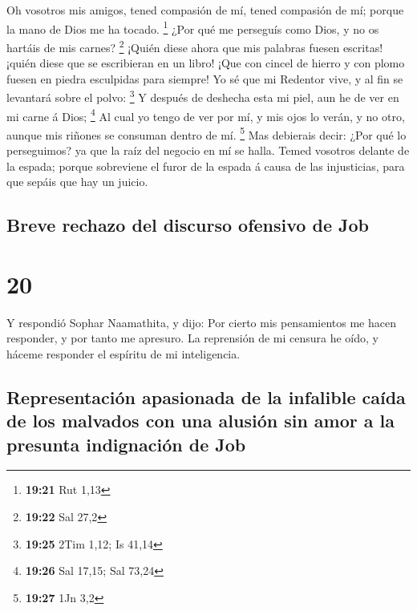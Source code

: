 Oh vosotros mis amigos, tened compasión de mí, tened
compasión de mí; porque la mano de Dios me ha tocado. \footnote{\textbf{19:21}
  Rut 1,13}  ¿Por qué me perseguís como Dios, y no os
hartáis de mis carnes? \footnote{\textbf{19:22} Sal 27,2} 
¡Quién diese ahora que mis palabras fuesen escritas! ¡quién diese que se
escribieran en un libro!  ¡Que con cincel de hierro y con
plomo fuesen en piedra esculpidas para siempre!  Yo sé que
mi Redentor vive, y al fin se levantará sobre el polvo: \footnote{\textbf{19:25}
  2Tim 1,12; Is 41,14}  Y después de deshecha esta mi piel,
aun he de ver en mi carne á Dios; \footnote{\textbf{19:26} Sal 17,15;
  Sal 73,24}  Al cual yo tengo de ver por mí, y mis ojos lo
verán, y no otro, aunque mis riñones se consuman dentro de mí.
\footnote{\textbf{19:27} 1Jn 3,2}  Mas debierais decir:
¿Por qué lo perseguimos? ya que la raíz del negocio en mí se halla.
 Temed vosotros delante de la espada; porque sobreviene el
furor de la espada á causa de las injusticias, para que sepáis que hay
un juicio.

\hypertarget{breve-rechazo-del-discurso-ofensivo-de-job}{%
\subsection{Breve rechazo del discurso ofensivo de
Job}\label{breve-rechazo-del-discurso-ofensivo-de-job}}

\hypertarget{section-19}{%
\section{20}\label{section-19}}

 Y respondió Sophar Naamathita, y dijo:  Por
cierto mis pensamientos me hacen responder, y por tanto me apresuro.
 La reprensión de mi censura he oído, y háceme responder el
espíritu de mi inteligencia.

\hypertarget{representaciuxf3n-apasionada-de-la-infalible-cauxedda-de-los-malvados-con-una-alusiuxf3n-sin-amor-a-la-presunta-indignaciuxf3n-de-job}{%
\subsection{Representación apasionada de la infalible caída de los
malvados con una alusión sin amor a la presunta indignación de
Job}\label{representaciuxf3n-apasionada-de-la-infalible-cauxedda-de-los-malvados-con-una-alusiuxf3n-sin-amor-a-la-presunta-indignaciuxf3n-de-job}}

